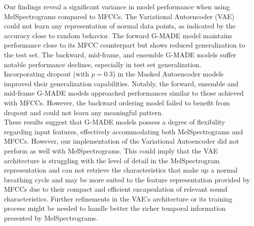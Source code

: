 Our findings reveal a significant variance in model performance when using MelSpectrograms compared to MFCCs. The Variational Autoencoder (VAE) could not learn any representation of normal data points, as indicated by the accuracy close to random behavior. The forward G-MADE model maintains performance close to its MFCC counterpart but shows reduced generalization to the test set. The backward, mid-frame, and ensemble G-MADE models suffer notable performance declines, especially in test set generalization.\\
Incorporating dropout (with $p=0.3$) in the Masked Autoencoder models improved their generalization capabilities. Notably, the forward, ensemble and mid-frame G-MADE models approached performances similar to those achieved with MFCCs. However, the backward ordering model failed to benefit from dropout and could not learn any meaningful pattern.\\
These results suggest that G-MADE models possess a degree of flexibility regarding input features, effectively accommodating both MelSpectrograms and MFCCs. However, our implementation of the Variational Autoencoder did not perform as well with MelSpectrograms. This could imply that the VAE architecture is struggling with the level of detail in the MelSpectrogram representation and can not retrieve the characteristics that make up a normal breathing cycle and may be more suited to the feature representation provided by MFCCs due to their compact and efficient encapsulation of relevant sound characteristics. Further refinements in the VAE's architecture or its training process might be needed to handle better the richer temporal information presented by MelSpectrograms.

